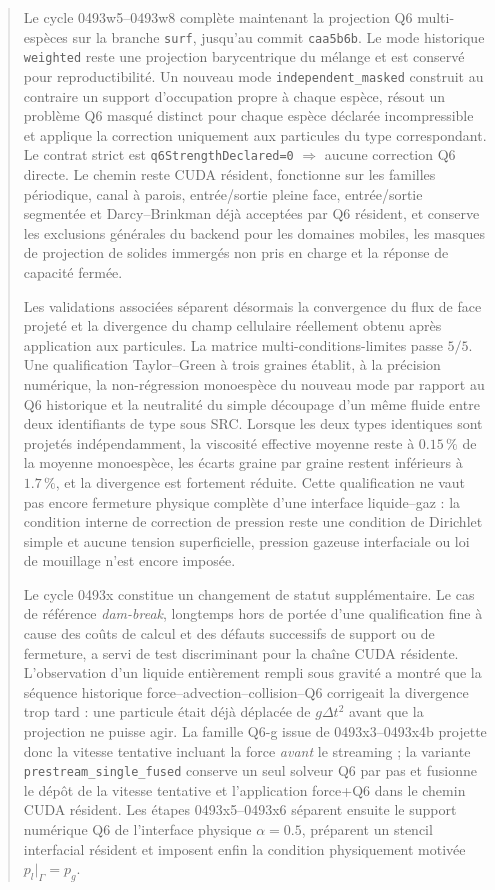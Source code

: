 \documentclass[11pt,a4paper]{article}
\begin{document}
\begin{abstract}
Le cycle 0493w5--0493w8 complète maintenant la projection Q6 multi-espèces sur la branche \texttt{surf}, jusqu'au commit \texttt{caa5b6b}. Le mode historique \texttt{weighted} reste une projection barycentrique du mélange et est conservé pour reproductibilité. Un nouveau mode \texttt{independent\_masked} construit au contraire un support d'occupation propre à chaque espèce, résout un problème Q6 masqué distinct pour chaque espèce déclarée incompressible et applique la correction uniquement aux particules du type correspondant. Le contrat strict est \texttt{q6StrengthDeclared=0} $\Rightarrow$ aucune correction Q6 directe. Le chemin reste CUDA résident, fonctionne sur les familles périodique, canal à parois, entrée/sortie pleine face, entrée/sortie segmentée et Darcy--Brinkman déjà acceptées par Q6 résident, et conserve les exclusions générales du backend pour les domaines mobiles, les masques de projection de solides immergés non pris en charge et la réponse de capacité fermée.

Les validations associées séparent désormais la convergence du flux de face projeté et la divergence du champ cellulaire réellement obtenu après application aux particules. La matrice multi-conditions-limites passe $5/5$. Une qualification Taylor--Green à trois graines établit, à la précision numérique, la non-régression monoespèce du nouveau mode par rapport au Q6 historique et la neutralité du simple découpage d'un même fluide entre deux identifiants de type sous SRC. Lorsque les deux types identiques sont projetés indépendamment, la viscosité effective moyenne reste à $0.15\,\%$ de la moyenne monoespèce, les écarts graine par graine restent inférieurs à $1.7\,\%$, et la divergence est fortement réduite. Cette qualification ne vaut pas encore fermeture physique complète d'une interface liquide--gaz : la condition interne de correction de pression reste une condition de Dirichlet simple et aucune tension superficielle, pression gazeuse interfaciale ou loi de mouillage n'est encore imposée.


Le cycle 0493x constitue un changement de statut supplémentaire. Le cas de référence 
\emph{dam-break}, longtemps hors de portée d'une qualification fine à cause des coûts de calcul et des défauts successifs de support ou de fermeture, a servi de test discriminant pour la chaîne CUDA résidente. L'observation d'un liquide entièrement rempli sous gravité a montré que la séquence historique force--advection--collision--Q6 corrigeait la divergence trop tard : une particule était déjà déplacée de $g\Delta t^2$ avant que la projection ne puisse agir. La famille Q6-g issue de 0493x3--0493x4b projette donc la vitesse tentative incluant la force \emph{avant} le streaming ; la variante \texttt{prestream\_single\_fused} conserve un seul solveur Q6 par pas et fusionne le dépôt de la vitesse tentative et l'application force+Q6 dans le chemin CUDA résident. Les étapes 0493x5--0493x6 séparent ensuite le support numérique Q6 de l'interface physique $\alpha=0.5$, préparent un stencil interfacial résident et imposent enfin la condition physiquement motivée $p_l|_\Gamma=p_g$.


\end{abstract}
\end{document}
